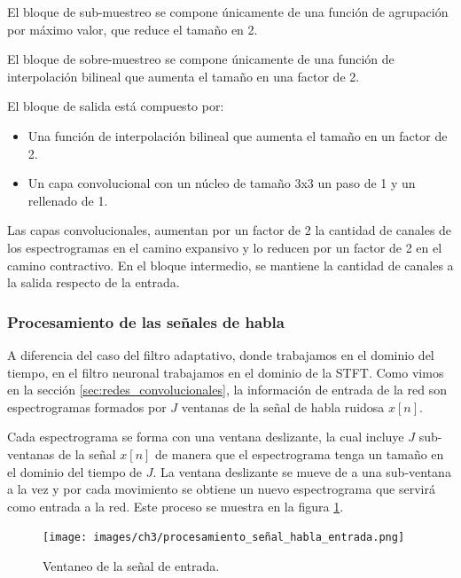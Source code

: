 El bloque de sub-muestreo se compone únicamente de una función de agrupación por máximo valor, que reduce el tamaño en 2.

El bloque de sobre-muestreo se compone únicamente de una función de interpolación bilineal que aumenta el tamaño en una factor de 2.

El bloque de salida está compuesto por:

\begin{itemize}
	\item Una función de interpolación bilineal que aumenta el tamaño en un factor de 2.
	\item Un capa convolucional con un núcleo de tamaño 3x3 un paso de 1 y un rellenado de 1.
\end{itemize}

Las capas convolucionales, aumentan por un factor de 2 la cantidad de canales de los espectrogramas en el camino expansivo y lo reducen por un factor de 2 en el camino contractivo. En el bloque intermedio, se mantiene la cantidad de canales a la salida respecto de la entrada.

\subsubsection{Procesamiento de las señales de habla}
\label{sec:filtro_neuronal_procesamiento_de_señales}

A diferencia del caso del filtro adaptativo, donde trabajamos en el dominio del tiempo, en el filtro neuronal trabajamos en el dominio de la STFT. Como vimos en la sección \ref{sec:redes_convolucionales}, la información de entrada de la red son espectrogramas formados por $J$ ventanas de la señal de habla ruidosa $x[n]$.

Cada espectrograma se forma con una ventana deslizante, la cual incluye $J$ sub-ventanas de la señal $x[n]$ de manera que el espectrograma tenga un tamaño en el dominio del tiempo de $J$. La ventana deslizante se mueve de a una sub-ventana a la vez y por cada movimiento se obtiene un nuevo espectrograma que servirá como entrada a la red. Este proceso se muestra en la figura \ref{fig:ch3_procesamiento_señal_habla_entrada}.

\begin{figure}
	\centering
	\centerline{\texttt{[image: images/ch3/procesamiento\_señal\_habla\_entrada.png]}}
	\caption{Ventaneo de la señal de entrada.}
	\label{fig:ch3_procesamiento_señal_habla_entrada}
\end{figure}

